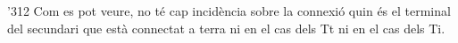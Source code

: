 \begin{exemple}[\ConnexWatt{}]
\begin{dingautolist}{'312}
    Com es pot veure, no té cap incidència sobre la connexió quin és
    el terminal del secundari que està connectat a terra ni en el cas
    dels Tt ni en el cas dels Ti.
    \end{dingautolist}
\end{exemple}
